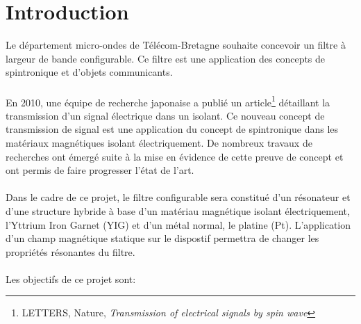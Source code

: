 \documentclass[12pt,fleqn]{book} %
\begin{document}


\pagestyle{empty} %

\tableofcontents %

\pagestyle{fancy}
\part{Introduction}
Le département micro-ondes de Télécom-Bretagne souhaite concevoir un filtre à
largeur de bande configurable. Ce filtre est une application des concepts de spintronique et d’objets communicants.
~\\\\En 2010, une équipe de recherche japonaise a publié un article\footnote{LETTERS, Nature, \emph{Transmission of electrical signals by spin wave}} détaillant la transmission d’un signal électrique dans un isolant. Ce nouveau concept de transmission de
signal est une application du concept de spintronique dans les matériaux magnétiques
isolant électriquement. De nombreux travaux de recherches ont émergé suite à la mise
en évidence de cette preuve de concept et ont permis de faire progresser l’état de l’art.
~\\\\Dans le cadre de ce projet, le filtre configurable sera constitué d’un résonateur et d’une
structure hybride à base d’un matériau magnétique isolant électriquement, l’Yttrium
Iron Garnet (YIG) et d’un métal normal, le platine (Pt). L’application d’un champ
magnétique statique sur le dispostif permettra de changer les propriétés résonantes du
filtre.
~\\\\Les objectifs de ce projet sont:
~\\
\end{document}
